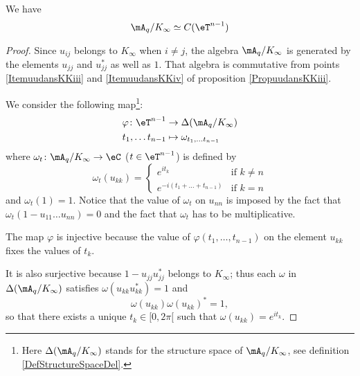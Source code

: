 \begin{proposition}
    We have
    \begin{equation}
        \mA_q/K_{\infty}\simeq C(\eT^{n-1})
    \end{equation}
    
\end{proposition}

\begin{proof}
    Since $u_{ij}$ belongs to $K_{\infty}$ when $i\neq j$, the algebra $\mA_q/K_{\infty}$ is generated by the elements $u_{jj}$ and $u_{jj}^*$ as well as $1$. That algebra is commutative from points \ref{ItemuudansKKiii} and \ref{ItemuudansKKiv} of proposition \ref{PropuudansKKiii}.

    We consider the following map\footnote{Here $\Delta(\mA_q/K_{\infty})$ stands for the structure space of $\mA_q/K_{\infty}$, see definition \ref{DefStructureSpaceDel}.}:
    \begin{equation}
        \begin{aligned}
            \varphi\colon \eT^{n-1}&\to \Delta(\mA_q/K_{\infty}) \\
            t_1,\ldots t_{n-1}&\mapsto \omega_{t_1,\ldots t_{n-1}} 
        \end{aligned}
    \end{equation}
    where $\omega_t\colon \mA_q/K_{\infty}\to \eC$ ($t\in\eT^{n-1}$) is defined by
    \begin{equation}
        \omega_t(u_{kk})=\begin{cases}
            e^{it_k}    &   \text{if $k\neq n$}\\
            e^{-i(t_1+\ldots+t_{n-1})}  &    \text{if $k=n$}
        \end{cases}
    \end{equation}
    and $\omega_t(1)=1$. Notice that the value of $\omega_t$ on $u_{nn}$ is imposed by the fact that $\omega_t(1-u_{11}\ldots u_{nn})=0$ and the fact that $\omega_t$ has to be multiplicative.

    The map $\varphi$ is injective because the value of $\varphi(t_1,\ldots,t_{n-1})$ on the element $u_{kk}$ fixes the values of $t_k$.

    It is also surjective because $1-u_{jj}u_{jj}^*$ belongs to $K_{\infty}$; thus each $\omega$ in $\Delta(\mA_q/K_{\infty})$ satisfies $\omega(u_{kk}u_{kk}^*)=1$ and
    \begin{equation}
        \omega(u_{kk})\omega(u_{kk})^*=1,
    \end{equation}
    so that there exists a unique $t_k\in\mathopen[ 0 , 2\pi [$ such that $\omega(u_{kk})= e^{it_k}$.


\end{proof}
